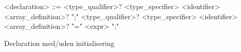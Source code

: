 \begin{Grammar}
 \begin{grammar}

  <declaration> ::= <type\_qualifier>? <type\_specifier> <identifier> <array\_definition>? ";"
  \alt <type_qualifier>? <type_specifier> <identifier> <array_definition>? "=" <expr> ";"
  
  
 \end{grammar}
 \caption{Declaration med/uden initialisering}\label{gra:declaration}
\end{Grammar}